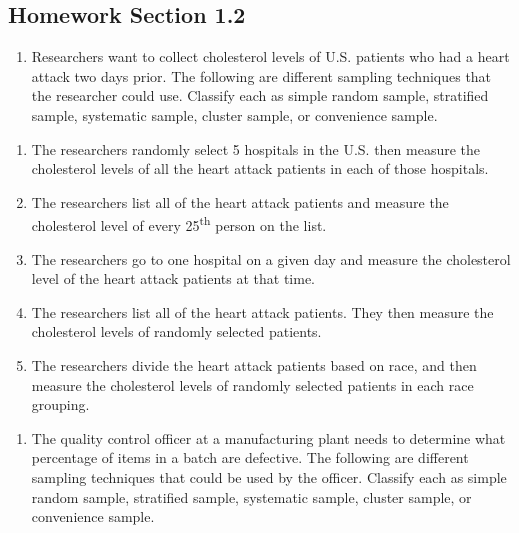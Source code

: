 \documentclass[
]{book}
\providecommand{\tightlist}{%
  \setlength{\itemsep}{0pt}\setlength{\parskip}{0pt}}
\begin{document}
\hypertarget{homework-section-1.2}{%
\subsection{Homework Section 1.2}\label{homework-section-1.2}}

\begin{enumerate}
\def\labelenumi{\arabic{enumi}.}
\tightlist
\item
  Researchers want to collect cholesterol levels of U.S. patients who had a heart attack two days prior. The following are different sampling techniques that the researcher could use. Classify each as simple random sample, stratified sample, systematic sample, cluster sample, or convenience sample.
\end{enumerate}

\begin{enumerate}
\def\labelenumi{\alph{enumi}.}
\tightlist
\item
  The researchers randomly select 5 hospitals in the U.S. then measure the cholesterol levels of all the heart attack patients in each of those hospitals.
\item
  The researchers list all of the heart attack patients and measure the cholesterol level of every 25\textsuperscript{th} person on the list.
\item
  The researchers go to one hospital on a given day and measure the cholesterol level of the heart attack patients at that time.
\item
  The researchers list all of the heart attack patients. They then measure the cholesterol levels of randomly selected patients.
\item
  The researchers divide the heart attack patients based on race, and then measure the cholesterol levels of randomly selected patients in each race grouping.
\end{enumerate}

\begin{enumerate}
\def\labelenumi{\arabic{enumi}.}
\setcounter{enumi}{1}
\tightlist
\item
  The quality control officer at a manufacturing plant needs to
  determine what percentage of items in a batch are defective. The
  following are different sampling techniques that could be used by
  the officer. Classify each as simple random sample, stratified
  sample, systematic sample, cluster sample, or convenience sample.
\end{enumerate}
\end{document}
